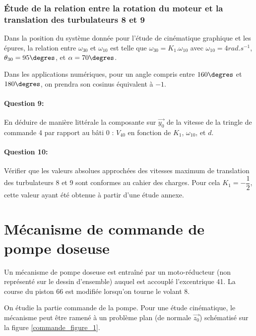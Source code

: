 \subsubsection{Étude de la relation entre la rotation du moteur et la translation des turbulateurs 8 et 9}

Dans la position du système donnée pour l'étude de cinématique graphique et les épures, la relation entre $\omega_{30}$ et $\omega_{10}$ est telle que $\omega_{30}=K_1.\omega_{10}$ avec $\omega_{10}=4rad.s^{-1}$, $\theta_{30}=95\degres$, et $\alpha=70\degres$.

Dans les applications numériques, pour un angle compris entre $160\degres$ et $180\degres$, on prendra son cosinus équivalent à $-1$.

\paragraph{Question 9:} En déduire de manière littérale la composante sur $\overrightarrow{y_0}$ de la vitesse de la tringle de commande 4 par rapport au bâti 0 : $V_{40}$ en fonction de $K_1$, $\omega_{10}$, et $d$.

\paragraph{Question 10:} Vérifier que les valeurs absolues approchées des vitesses maximum de translation des turbulateurs 8 et 9 sont conformes au cahier des charges. Pour cela $K_1=-\dfrac{1}{2}$, cette valeur ayant été obtenue à partir d'une étude annexe.



\section{Mécanisme de commande de pompe doseuse}

Un mécanisme de pompe doseuse est entraîné par un moto-réducteur (non représenté sur le dessin d'ensemble) auquel est accouplé l'excentrique 41. La course du piston 66 est modifiée lorsqu'on tourne le volant 8.

On étudie la partie commande de la pompe. Pour une étude cinématique, le mécanisme peut être ramené à un problème plan (de normale $\overrightarrow{z_0}$) schématisé sur la figure \ref{commande_figure_1}.

